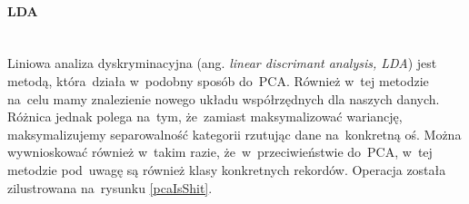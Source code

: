\paragraph{LDA}\mbox{}\\
Liniowa analiza dyskryminacyjna (ang. \textit{linear discrimant analysis, LDA})\cite{ldaBriefTutorial} jest metodą, która~działa w~podobny sposób do~PCA. Również w~tej metodzie na~celu mamy znalezienie nowego układu współrzędnych dla naszych danych. Różnica jednak polega na~tym, że~zamiast maksymalizować wariancję, maksymalizujemy separowalność kategorii rzutując dane na~konkretną oś. Można wywnioskować również w~takim razie, że~w~przeciwieństwie do~PCA, w~tej metodzie pod~uwagę są również klasy konkretnych rekordów. Operacja została zilustrowana na~rysunku \ref{pcaIsShit}. 


